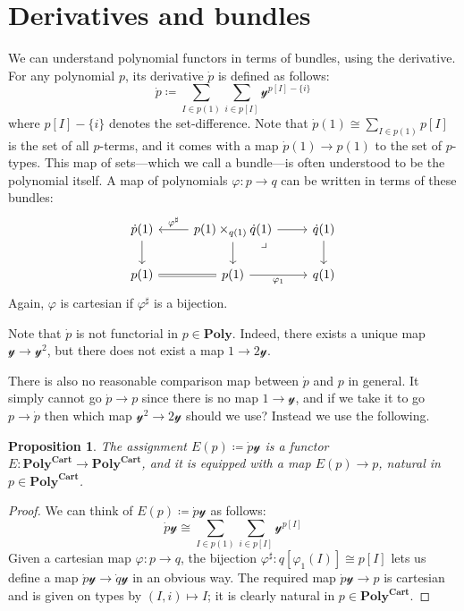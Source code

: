 \documentclass[11pt, one side, article]{memoir}
\theoremstyle{definition}
\theoremstyle{plain}
\newtheorem{proposition}[definitionx]{Proposition}
\newenvironment{remark}
  {\pushQED{\qed}\renewcommand{\qedsymbol}{$\lozenge$}\remarkx}
  {\popQED\endremarkx}
\newcommand{\Cat}[1]{\mathbf{#1}}%
\newcommand{\yon}{\mathcal{y}}
\newcommand{\poly}{\Cat{Poly}}
\newcommand{\polycart}{\poly^{\Cat{Cart}}}
\newcommand{\0}{\textsf{0}}
\newcommand{\1}{\tn{\textsf{1}}}
\begin{document}
\section{Derivatives and bundles}

We can understand polynomial functors in terms of bundles, using the derivative. For any polynomial $p$, its derivative $\dot{p}$ is defined as follows:
\[
\dot{p}\coloneqq\sum_{I\in p(1)}\sum_{i\in p[I]}\yon^{p[I]-\{i\}}
\]
where $p[I]-\{i\}$ denotes the set-difference. Note that $\dot{p}(1)\cong\sum_{I\in p(1)}p[I]$ is the set of all $p$-terms, and it comes with a map $\dot{p}(1)\to p(1)$ to the set of $p$-types. This map of sets---which we call a bundle---is often understood to be the polynomial itself. A map of polynomials $\varphi\colon p\to q$ can be written in terms of these bundles:
\[
\begin{tikzcd}
	\dot{p}(1)\ar[d]&p(1)\times_{q(1)}\dot{q}(1)\ar[l, "\varphi^\sharp"']\ar[r]\ar[d]&\dot{q}(1)\ar[d]\\
	p(1)\ar[r, equal]&p(1)\ar[r, "\varphi_1"']&q(1)\ar[ul, phantom, very near end, "\lrcorner"]
\end{tikzcd}
\]
Again, $\varphi$ is cartesian if $\varphi^\sharp$ is a bijection.

\begin{remark}
Note that $\dot{p}$ is not functorial in $p\in\poly$. Indeed, there exists a unique map $\yon\to\yon^2$, but there does not exist a map $1\to 2\yon$.

There is also no reasonable comparison map between $\dot{p}$ and $p$ in general. It simply cannot go $\dot{p}\to p$ since there is no map $1\to\yon$, and if we take it to go $p\to\dot{p}$ then which map $\yon^2\to 2\yon$ should we use? Instead we use the following.
\end{remark}

\begin{proposition}
The assignment $E(p)\coloneqq\dot{p}\yon$ is a functor $E\colon\polycart\to\polycart$, and it is equipped with a map $E(p)\to p$, natural in $p\in\polycart$.
\end{proposition}
\begin{proof}
We can think of $E(p)\coloneqq\dot{p}\yon$ as follows:
\begin{equation}\label{eqn.derivy}
\dot{p}\yon\cong\sum_{I\in p(1)}\sum_{i\in p[I]}\yon^{p[I]}
\end{equation}
Given a cartesian map $\varphi\colon p\to q$, the bijection $\varphi^\sharp\colon q[\varphi_1(I)]\cong p[I]$ lets us define a map $\dot{p}\yon\to\dot{q}\yon$ in an obvious way. The required map $\dot{p}\yon\to p$ is cartesian and is given on types by $(I,i)\mapsto I$; it is clearly natural in $p\in\polycart$.
\end{proof}
\end{document}
